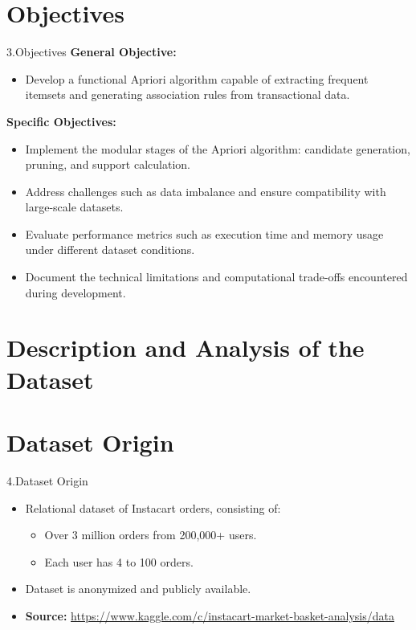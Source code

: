 \documentclass{beamer}
\begin{document}

\section{Objectives}

\begin{frame}{3.Objectives}
    \textbf{General Objective:}
    \begin{itemize}
        \item Develop a functional Apriori algorithm capable of extracting frequent itemsets and generating association rules from transactional data.
    \end{itemize}

    \textbf{Specific Objectives:}
    \begin{itemize}
        \item Implement the modular stages of the Apriori algorithm: candidate generation, pruning, and support calculation.
        \item Address challenges such as data imbalance and ensure compatibility with large-scale datasets.
        \item Evaluate performance metrics such as execution time and memory usage under different dataset conditions.
        \item Document the technical limitations and computational trade-offs encountered during development.
    \end{itemize}
\end{frame}

\section{Description and Analysis of the Dataset}

\section{Dataset Origin}

\begin{frame}{4.Dataset Origin}
    \begin{itemize}
        \item Relational dataset of Instacart orders, consisting of:
        \begin{itemize}
            \item Over 3 million orders from 200,000+ users.
            \item Each user has 4 to 100 orders.
        \end{itemize}
        \item Dataset is anonymized and publicly available.
        \item \textbf{Source:} \url{https://www.kaggle.com/c/instacart-market-basket-analysis/data}
    \end{itemize}
\end{frame}
\end{document}
